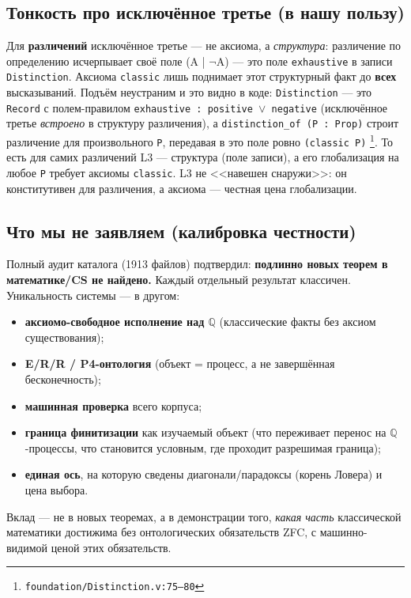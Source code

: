 \documentclass[11pt,a4paper]{article}
\begin{document}
\subsection{Тонкость про исключённое третье (в нашу пользу)}

Для \textbf{различений} исключённое третье --- не аксиома, а \emph{структура}: различение по определению исчерпывает своё поле (A | $\neg$A) --- это поле \texttt{exhaustive} в записи \texttt{Distinction}. Аксиома \texttt{classic} лишь поднимает этот структурный факт до \textbf{всех} высказываний. Подъём неустраним и это видно в коде: \texttt{Distinction} --- это \texttt{Record} с полем-правилом \texttt{exhaustive : positive $\lor$ negative} (исключённое третье \emph{встроено} в структуру различения), а \texttt{distinction\_\allowbreak{}of (P : Prop)} строит различение для произвольного \texttt{P}, передавая в это поле ровно \texttt{(classic P)} \footnote{\texttt{foundation/\allowbreak{}Distinction.v:75--80}}. То есть для самих различений L3 --- структура (поле записи), а его глобализация на любое \texttt{P} требует аксиомы \texttt{classic}. L3 не <<навешен снаружи>>: он конститутивен для различения, а аксиома --- честная цена глобализации.

\subsection{Что мы не заявляем (калибровка честности)}

Полный аудит каталога (1913 файлов) подтвердил: \textbf{подлинно новых теорем в математике/CS не найдено.} Каждый отдельный результат классичен. Уникальность системы --- в другом:

\begin{itemize}
\item \textbf{аксиомо-свободное исполнение над $\mathbb{Q}$} (классические факты без аксиом существования);
\item \textbf{E/R/R / P4-онтология} (объект = процесс, а не завершённая бесконечность);
\item \textbf{машинная проверка} всего корпуса;
\item \textbf{граница финитизации} как изучаемый объект (что переживает перенос на $\mathbb{Q}$-процессы, что становится условным, где проходит разрешимая граница);
\item \textbf{единая ось}, на которую сведены диагонали/парадоксы (корень Ловера) и цена выбора.
\end{itemize}

Вклад --- не в новых теоремах, а в демонстрации того, \emph{какая часть} классической математики достижима без онтологических обязательств ZFC, с машинно-видимой ценой этих обязательств.
\end{document}
